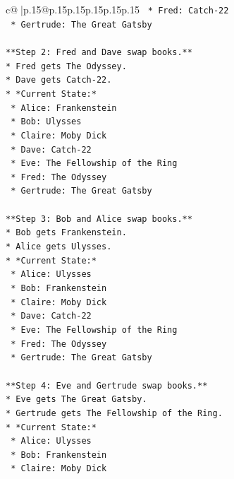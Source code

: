 \documentclass{article}
\begin{document}
{\begin{supertabular}{c@{$\;$}|p{.15\linewidth}@{}p{.15\linewidth}p{.15\linewidth}p{.15\linewidth}p{.15\linewidth}p{.15\linewidth}}
{{{\texttt{    *   Fred: Catch{-}22} \\
\texttt{    *   Gertrude: The Great Gatsby} \\
\\ 
\texttt{**Step 2: Fred and Dave swap books.**} \\
\texttt{*   Fred gets The Odyssey.} \\
\texttt{*   Dave gets Catch{-}22.} \\
\texttt{*   *Current State:*} \\
\texttt{    *   Alice: Frankenstein} \\
\texttt{    *   Bob: Ulysses} \\
\texttt{    *   Claire: Moby Dick} \\
\texttt{    *   Dave: Catch{-}22} \\
\texttt{    *   Eve: The Fellowship of the Ring} \\
\texttt{    *   Fred: The Odyssey} \\
\texttt{    *   Gertrude: The Great Gatsby} \\
\\ 
\texttt{**Step 3: Bob and Alice swap books.**} \\
\texttt{*   Bob gets Frankenstein.} \\
\texttt{*   Alice gets Ulysses.} \\
\texttt{*   *Current State:*} \\
\texttt{    *   Alice: Ulysses} \\
\texttt{    *   Bob: Frankenstein} \\
\texttt{    *   Claire: Moby Dick} \\
\texttt{    *   Dave: Catch{-}22} \\
\texttt{    *   Eve: The Fellowship of the Ring} \\
\texttt{    *   Fred: The Odyssey} \\
\texttt{    *   Gertrude: The Great Gatsby} \\
\\ 
\texttt{**Step 4: Eve and Gertrude swap books.**} \\
\texttt{*   Eve gets The Great Gatsby.} \\
\texttt{*   Gertrude gets The Fellowship of the Ring.} \\
\texttt{*   *Current State:*} \\
\texttt{    *   Alice: Ulysses} \\
\texttt{    *   Bob: Frankenstein} \\
\texttt{    *   Claire: Moby Dick} \\
}}}
\end{supertabular}}
\end{document}
